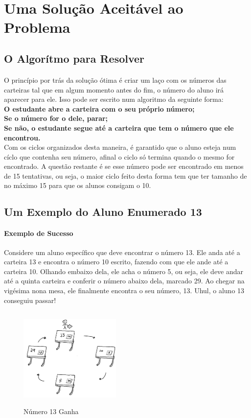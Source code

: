 \documentclass{article}
\begin{document}
    \section{Uma Solu\c c\~ao Aceit\'avel ao Problema}
    \subsection{O Algor\'itmo para Resolver}
        \paragraph{}O princ\'ipio por tr\'as da solu\c c\~ao \'otima \'e criar um la\c co com os n\'umeros das carteiras tal que em algum momento antes do fim, 
        o n\'umero do aluno ir\'a aparecer para ele. Isso pode ser escrito num algoritmo da seguinte forma: \\
        \textbf{O estudante abre a carteira com o seu pr\'oprio n\'umero;}\\
        \textbf{Se o n\'umero for o dele, parar;}\\
        \textbf{Se n\~ao, o estudante segue at\'e a carteira que tem o n\'umero que ele encontrou.}\\
        Com os ciclos organizados desta maneira, \'e garantido que o aluno esteja num c\'iclo que contenha seu n\'umero, afinal o ciclo s\'o termina quando o mesmo for
        encontrado. A quest\~ao restante \'e se esse n\'umero pode ser encontrado em menos de 15 tentativas, ou seja, o maior ciclo feito desta forma tem que ter 
        tamanho de no m\'aximo 15 para que os alunos consigam o 10. 
    \subsection{Um Exemplo do Aluno Enumerado 13}
    \paragraph*{Exemplo de Sucesso}Considere um aluno espec\'ifico que deve encontrar o n\'umero 13. Ele anda at\'e a carteira 13 e encontra o n\'umero 10 escrito, fazendo com que ele ande 
    at\'e a carteira 10. Olhando embaixo dela, ele acha o n\'umero 5, ou seja, ele deve andar at\'e a quinta carteira e conferir o n\'umero abaixo dela, marcado
    29. Ao chegar na vig\'esima nona mesa, ele finalmente encontra o seu n\'umero, 13. Uhul, o aluno 13 conseguiu passar!
    \begin{figure}[h]
        \centering
        \includegraphics[width=5cm, height=5cm]{Win.png}
        \caption{N\'umero 13 Ganha}
    \end{figure}
    
\end{document}
